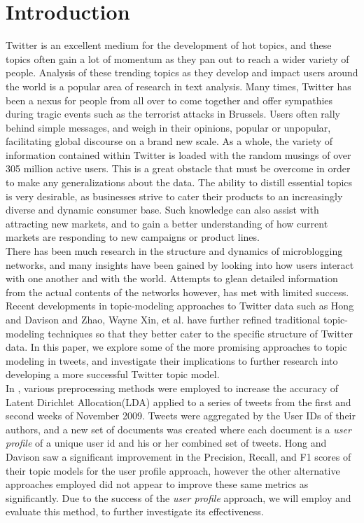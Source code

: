 \documentclass{acm_proc_article-sp}
\begin{document}
\section{Introduction}
\hspace*{5mm}Twitter is an excellent medium for the development of hot topics, and these topics often gain a lot of momentum as they pan out to reach a wider variety of people. Analysis of these trending topics as they develop and impact users around the world is a popular area of research in text analysis. Many times, Twitter has been a nexus for people from all over to come together and offer sympathies during tragic events such as the terrorist attacks in Brussels. Users often rally behind simple messages, and weigh in their opinions, popular or unpopular, facilitating global discourse on a brand new scale. As a whole, the variety of information contained within Twitter is loaded with the random musings of over 305 million active users. This is a great obstacle that must be overcome in order to make any generalizations about the data. The ability to distill essential topics is very desirable, as businesses strive to cater their products to an increasingly diverse and dynamic consumer base. Such knowledge can also assist with attracting new markets, and to gain a better understanding of how current markets are responding to new campaigns or product lines.\\
\hspace*{5mm}There has been much research in the structure and dynamics of microblogging networks, and many insights have been gained by looking into how users interact with one another and with the world. Attempts to glean detailed information from the actual contents of the networks however, has met with limited success. Recent developments in topic-modeling approaches to Twitter data such as Hong and Davison\cite{hong2010empirical} and Zhao, Wayne Xin, et al.\cite{zhao2011comparing} have further refined traditional topic-modeling techniques so that they better cater to the specific structure of Twitter data. In this paper, we explore some of the more promising approaches to topic modeling in tweets, and investigate their implications to further research into developing a more successful Twitter topic model.\\
\hspace*{5mm}In \cite{hong2010empirical}, various preprocessing methods were employed to increase the accuracy of Latent Dirichlet Allocation(LDA) applied to a series of tweets from the first and second weeks of November 2009. Tweets were aggregated by the User IDs of their authors, and a new set of documents was created where each document is a \textit{user profile} of a unique user id and his or her combined set of tweets. Hong and Davison saw a significant improvement in the Precision, Recall, and F1 scores of their topic models for the user profile approach, however the other alternative approaches employed did not appear to improve these same metrics as significantly. Due to the success of the \textit{user profile} approach, we will employ and evaluate this method, to further investigate its effectiveness.\\
\end{document}
